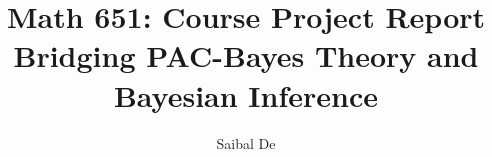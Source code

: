 \documentclass{amsart}
\title{
  Math 651: Course Project Report\\
  Bridging PAC-Bayes Theory and Bayesian Inference
}
\author{
  Saibal De
}
\theoremstyle{definition}
\begin{document}
\maketitle







\nocite{*}


\end{document}
